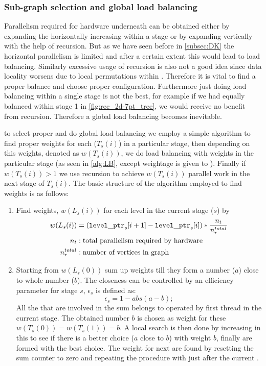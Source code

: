 \subsubsection{Sub-graph selection and global load balancing} \label{subsec:subgraph_selection}
Parallelism required for hardware underneath can be obtained either by expanding the \levelTree horizontally \ie increasing \levelGroups within a stage or by expanding \levelTree vertically with the help of recursion. But as we have seen before in \cref{subsec:DK} the horizontal parallelism is limited and after a certain extent this would lead to load balancing. Similarly excessive usage of recursion is also not a good idea since data locality worsens due to local permutations within \subgraph. Therefore it is vital to find a proper balance and choose proper configuration. Furthermore just doing load balancing within a single stage is not the best, for example if we had equally balanced within stage 1 in \cref{fig:rec_2d-7pt_tree}, we would receive no benefit from recursion. Therefore a global load balancing becomes inevitable.

\Inorder to select proper \subgraph and do global load balancing we employ a simple algorithm to find proper weights for each \levelGroup ($T_s(i)$) in a particular stage, then depending on this weights, denoted as $w(T_s(i))$, we do load balancing with weights in the particular stage (as seen in \cref{alg:LB}, except weightage is given to \levelGroups). Finally if $w(T_s(i)) > 1$ we use recursion to achieve $w(T_s(i))$ parallel work in the next stage of $T_s(i)$. The basic structure of the algorithm employed to find weights is as follows:
\begin{enumerate}
	\item Find weights, $w(L_s(i))$ for each level in the current stage ($s$) by
		\begin{align*}
			w(L_s(i)) &= ({\tt level\_ptr}_s[i+1] - {\tt level\_ptr}_s[i])*\frac{n_{t}}{n_{r}^{total}}\\
			n_{t} &: \text{total parallelism required by hardware}\\
			n_{r}^{total} &: \text{number of vertices in graph}
		\end{align*}
	
	\item Starting from $w(L_s(0))$ sum up weights till they form a number ($a$) close to whole number ($b$). The closeness can be controlled by an efficiency parameter for stage $s$, $\epsilon_s$ is defined as:
	\begin{equation} \label{eq:epsilon}
		\epsilon_s =  1 - abs(a-b);
	\end{equation}
	All the \levels that are involved in the sum belongs to \levelGroups  operated by first thread in the current stage. The obtained number $b$ is chosen as weight for these \levelGroups \ie $w(T_s(0))=w(T_s(1))=b$. A local search is then done by increasing \levels in this \levelGroups to see if there is a better choice ($a$ close to $b$) with weight $b$, finally \levelGroups are formed with the best choice.  The weight for next \levelGroups are found by resetting the sum counter to zero and repeating the  procedure with \levels just after the current \levelGroups.
\end{enumerate}